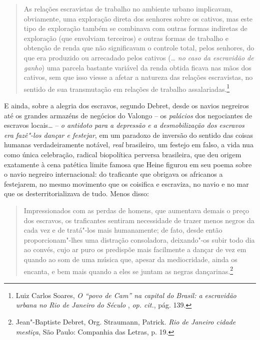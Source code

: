 \begin{quote}
As relações escravistas de trabalho no ambiente urbano implicavam, obviamente, uma
exploração direta dos senhores sobre os cativos, mas este tipo de
exploração também se combinava com outras formas indiretas de exploração
(que envolviam terceiros) e outras formas de trabalho e obtenção de
renda que não significavam o controle total, pelos senhores, do que era
produzido ou arrecadado pelos cativos (\ldots{} \emph{no caso da escravidão
de ganho}) uma parcela bastante variável da renda obtida ficava nas mãos
dos cativos, sem que isso viesse a afetar a natureza das relações
escravistas, no sentido de sua transmutação em relações de trabalho
assalariadas.\footnote{Luiz Carlos Soares, \emph{O ``povo de Cam'' na
  capital do Brasil: a escravidão urbana no Rio de Janeiro do Século
  }, \emph{op. cit.}, pág. 139.}
\end{quote}

E ainda, sobre a alegria dos escravos, segundo Debret, desde os navios
negreiros até os grandes armazéns de negócios do Valongo -- os
\emph{palácios} dos negociantes de escravos locais\ldots{}­ -- \emph{o
antidoto para a depressão e a desmobilização dos escravos era fazê"-los
dançar e festejar}, em um paradoxo de inversão do sentido das coisas
humanas verdadeiramente notável, \emph{real} brasileiro, um festejo em
falso, a vida nua como única celebração, radical biopolítica perversa
brasileira, que deu origem exatamente à cena patética limite famosa que
Heine figurou em seu poema sobre o navio negreiro internacional: do
traficante que obrigava os africanos a festejarem, no mesmo movimento
que os coisifica e escraviza, no navio e no mar que os
desterritorializava de tudo. Menos disso: 

\begin{quote}
Impressionados com as perdas de homens, que aumentava demais o preço dos escravos, os traficantes sentiram necessidade de trazer menos negros da cada vez e de tratá"-los
mais humanamente; de fato, desde então proporcionam"-lhes uma distração
consoladora, deixando"-os subir todo dia ao convés, cujo ar puro os
predispõe mais facilmente a dançar de vez em quando ao som de uma música
que, apesar da mediocridade, ainda os encanta, e bem mais quando a eles
se juntam as negras dançarinas.\footnote{Jean"-Baptiste Debret, Org.
  Straumann, Patrick. \emph{Rio de Janeiro cidade mestiça}, São Paulo:
  Companhia das Letras, p. 19.}
\end{quote}

